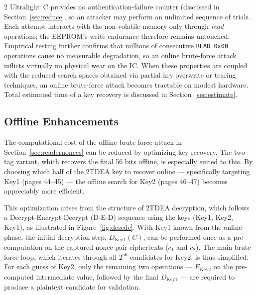 \documentclass[10pt,letterpaper]{article}
\begin{document}
\begin{multicols}{2}
Ultralight~C provides no authentication-failure counter (discussed in Section~\ref{sec:reduce}, so an attacker may perform an unlimited sequence of trials. Each attempt interacts with the non-volatile memory only through \textit{read} operations; the EEPROM's write endurance therefore remains untouched. Empirical testing further confirms that millions of consecutive \texttt{READ~0x00} operations cause no measurable degradation, so an online brute-force attack inflicts virtually no physical wear on the IC. When these properties are coupled with the reduced search spaces obtained via partial key overwrite or tearing techniques, an online brute-force attack becomes tractable on modest hardware. Total estimated time of a key recovery is discussed in Section~\ref{sec:estimate}.

\subsection{Offline Enhancements}
\label{sec:offlinetdes}
The computational cost of the offline brute-force attack in Section~\ref{sec:readernonces} can be reduced by optimizing key recovery. The two-tag variant, which recovers the final 56 bits offline, is especially suited to this. By choosing which half of the 2TDEA key to recover online --- specifically targeting Key1 (pages 44–45) --- the offline search for Key2 (pages 46–47) becomes appreciably more efficient.

This optimization arises from the structure of 2TDEA decryption, which follows a Decrypt-Encrypt-Decrypt (D-E-D) sequence using the keys (Key1, Key2, Key1), as illustrated in Figure~\ref{fig:desede}. With Key1 known from the online phase, the initial decryption step, $D_{\mathrm{Key1}}(C)$, can be performed once as a pre-computation on the captured nonce-pair ciphertexts ($c_1$ and $c_2$). The main brute-force loop, which iterates through all $2^{56}$ candidates for Key2, is thus simplified. For each guess of Key2, only the remaining two operations --- $E_{\mathrm{Key2}}$ on the pre-computed intermediate value, followed by the final $D_{\mathrm{Key1}}$ --- are required to produce a plaintext candidate for validation.

\begin{center}
\hspace{4mm}

\vspace{1mm}\newline
\captionsetup{hypcap=false}
\label{fig:desede}
\end{center}


\end{multicols}
\end{document}
